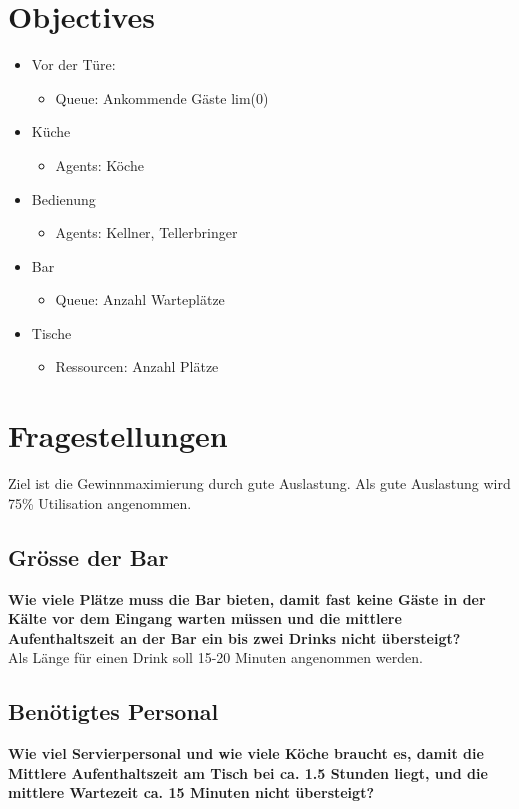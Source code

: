 \documentclass[ngerman,a4paper,12pt]{scrreprt}
\begin{document}
\section{Objectives}
\begin{itemize}
	\item Vor der Türe:
		\begin{itemize}
			\item Queue: Ankommende Gäste lim(0)
		\end{itemize}
	\item Küche
		\begin{itemize}
			\item Agents: Köche
		\end{itemize}
	\item Bedienung
		\begin{itemize}
			\item Agents: Kellner, Tellerbringer
		\end{itemize}
	\item Bar
		\begin{itemize}
			\item Queue: Anzahl Warteplätze
		\end{itemize}
	\item Tische
		\begin{itemize}
			\item Ressourcen: Anzahl Plätze
		\end{itemize}
\end{itemize}



\section{Fragestellungen}
Ziel ist die Gewinnmaximierung durch gute Auslastung. Als gute Auslastung wird 75\% Utilisation angenommen.
\subsection{Grösse der Bar}
\textbf{Wie viele Plätze muss die Bar bieten, damit fast keine Gäste in der Kälte vor dem Eingang warten müssen und die mittlere Aufenthaltszeit an der Bar ein bis zwei Drinks nicht übersteigt?} \\
Als Länge für einen Drink soll 15-20 Minuten angenommen werden.


\subsection{Benötigtes Personal}
\textbf{Wie viel Servierpersonal und wie viele Köche braucht es, damit die Mittlere Aufenthaltszeit am Tisch bei ca. 1.5 Stunden liegt, und die mittlere Wartezeit ca. 15 Minuten nicht übersteigt?} \\
\end{document}
